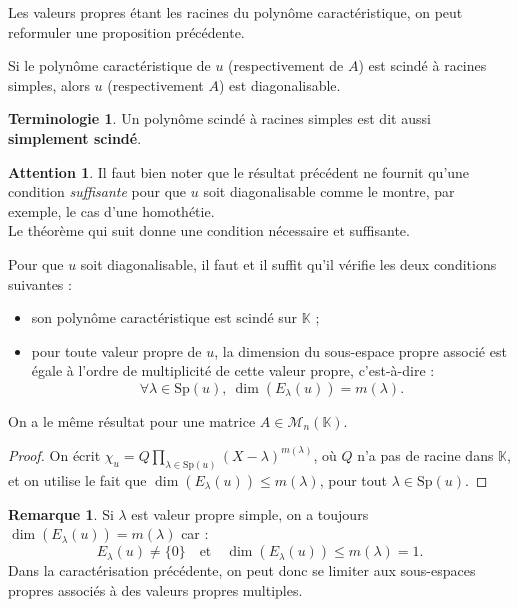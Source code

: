 \documentclass[french]{article}
\newcommand{\K}{\mathbb{K}}
\newcommand{\Sp}{\text{Sp}}
\theoremstyle{plain}
\theoremstyle{definition}
\newtheorem*{rmq}{Remarque}
\newtheorem*{terminologie}{Terminologie}
\newtheorem*{attention}{Attention}
\theoremstyle{remark}
\begin{document}
	Les valeurs propres étant les racines du polynôme caractéristique, on peut reformuler une proposition précédente.
	
	\begin{prop}%
		Si le polynôme caractéristique de $u$ (respectivement de $A$) est scindé à racines simples, alors $u$ (respectivement $A$) est diagonalisable.
	\end{prop}
	
	\begin{terminologie}
		Un polynôme scindé à racines simples est dit aussi \textbf{simplement scindé}.
	\end{terminologie}
	
	\begin{attention}
		Il faut bien noter que le résultat précédent ne fournit qu'une condition \textit{suffisante} pour que $u$ soit diagonalisable comme le montre, par exemple, le cas d'une homothétie.\\	Le théorème qui suit donne une condition nécessaire et suffisante.
	\end{attention}
	
	\begin{thm}%
		Pour que $u$ soit diagonalisable, il faut et il suffit qu'il vérifie les deux conditions suivantes :
		\begin{itemize}
			\item son polynôme caractéristique est scindé sur $\K$ ;
			\item pour toute valeur propre de $u$, la dimension du sous-espace propre associé est égale à l'ordre de multiplicité de cette valeur propre, c'est-à-dire :
			$$\forall\lambda\in\Sp(u),\ \dim(E_\lambda(u))=m(\lambda).$$
		\end{itemize}
		On a le même résultat pour une matrice $A\in\mathcal{M}_n(\K)$.
	\end{thm}
	\begin{proof}
		On écrit $\chi_u=Q\displaystyle\prod_{\lambda\in\Sp(u)}(X-\lambda)^{m(\lambda)}$, où $Q$ n'a pas de racine dans $\K$, et on utilise le fait que $\dim(E_\lambda(u))\leqslant m(\lambda)$, pour tout $\lambda\in\Sp(u)$.
	\end{proof}
	
	\begin{rmq}
		Si $\lambda$ est valeur propre simple, on a toujours $\dim(E_\lambda(u))=m(\lambda)$ car : $$E_\lambda(u)\ne\{0\}\quad\text{et}\quad\dim(E_\lambda(u))\leqslant m(\lambda)=1.$$
		Dans la caractérisation précédente, on peut donc se limiter aux sous-espaces propres associés à des valeurs propres multiples.
	\end{rmq}
	
\end{document}
